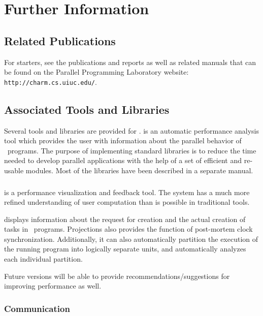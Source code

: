 \chapter{Further Information}

\section{Related Publications}
\label{publications}

For starters, see the publications and reports as well
as related manuals that can be found on the Parallel Programming
Laboratory website: \texttt{http://charm.cs.uiuc.edu/}. 

\section{Associated Tools and Libraries}

Several tools and libraries are provided for \charmpp{}. \projections{} 
is an automatic performance analysis tool which provides
the user with information about the parallel behavior of \charmpp\ programs. 
The purpose of implementing \charmpp{} standard
libraries is to reduce the time needed to develop parallel
applications with the help of a set of efficient and re-usable modules.
Most of the libraries have been described in a separate manual.

\subsection{\projections}

\projections{} is a performance visualization and feedback tool. The system has
a much more refined understanding of user computation than is possible in
traditional tools.

\projections{} displays information about the request for creation and the
actual creation of tasks in \charmpp\ programs. Projections also provides the
function of post-mortem clock synchronization. Additionally, it can also
automatically partition the execution of the running program into logically
separate units, and automatically analyzes each individual partition. 

Future versions will be able to provide recommendations/suggestions for
improving performance as well.

\subsection{Communication}

